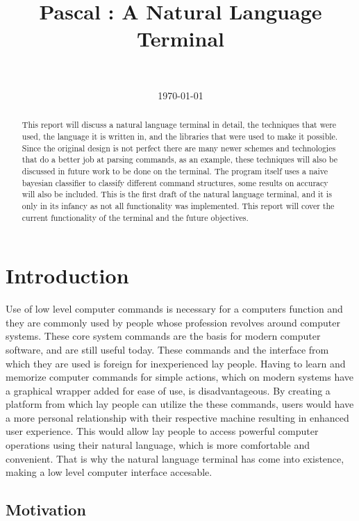 \documentclass[12pt]{article}
\title{Pascal : A Natural Language Terminal}
\author{
  \IEEEauthorblockN{Eric Adamski}\\
  \IEEEauthorblockA{
    {\small School of Computer Science}\\
    {\small Carleton University}\\
    {\small Ottawa, Ontario, Canada}\\
    {\small Email: \{eric.adamski@cmail.carleton.ca\}}
  }
}
\date{\today}
\begin{document}
\maketitle

\begin{abstract}
  This report will discuss a natural language terminal in detail, the techniques that were used, the language it is written in, and the libraries that were used to make it possible. Since the original design is not perfect there are many newer schemes and technologies that do a better job at parsing commands, as an example, these techniques will also be discussed in future work to be done on the terminal. The program itself uses a naive bayesian classifier to classify different command structures, some results on accuracy will also be included. This is the first draft of the natural language terminal, and it is only in its infancy as not all functionality was implemented. This report will cover the current functionality of the terminal and the future objectives.
\end{abstract}

\section{Introduction}

Use of low level computer commands is necessary for a computers function and they are commonly used by people whose profession revolves around computer systems. These core system commands are the basis for modern computer software, and are still useful today. These commands and the interface from which they are used is foreign for inexperienced lay people. Having to learn and memorize computer commands for simple actions, which on modern systems have a graphical wrapper added for ease of use, is disadvantageous. By creating a platform from which lay people can utilize the these commands, users would have a more personal relationship with their respective machine resulting in enhanced user experience. This would allow lay people to access powerful computer operations using their natural language, which is more comfortable and convenient. That is why the natural language terminal has come into existence, making a low level computer interface accesable.

\subsection{Motivation}
\end{document}
